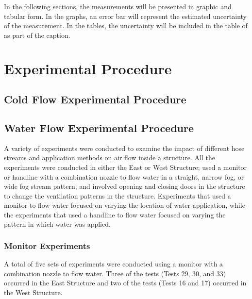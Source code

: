 \documentclass[12pt,oneside]{book}
\begin{document}

In the following sections, the measurements will be presented in graphic and tabular form. In the graphs, an error bar will represent the estimated uncertainty of the measurement. In the tables, the uncertainty will be included in the table of as part of the caption.

\section{Experimental Procedure}
\label{sec:Experimental_Procedure}

\subsection{Cold Flow Experimental Procedure}
\label{sec:Cold_Flow_Procedure}

\subsection{Water Flow Experimental Procedure}
\label{sec:Water_Flow_Procedure}
A variety of experiments were conducted to examine the impact of different hose streams and application methods on air flow inside a structure. All the experiments were conducted in either the East or West Structure; used a monitor or handline with a combination nozzle to flow water in a straight, narrow fog, or wide fog stream pattern; and involved opening and closing doors in the structure to change the ventilation patterns in the structure. Experiments that used a monitor to flow water focused on varying the location of water application, while the experiments that used a handline to flow water focused on varying the pattern in which water was applied.

\subsubsection{Monitor Experiments}
\label{sec:Water_Flow_Monitor_Procedure}
A total of five sets of experiments were conducted using a monitor with a combination nozzle to flow water. Three of the tests (Tests 29, 30, and 33) occurred in the East Structure and two of the tests (Tests 16 and 17) occurred in the West Structure. 
\end{document}
